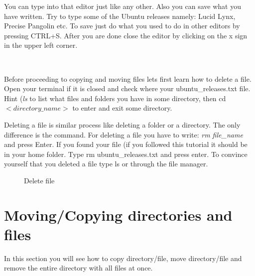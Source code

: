 \par \noindent You can type into that editor just like any other. Also you can save what you have written. Try to type some of the Ubuntu releases namely: Lucid Lynx, Precise Pangolin etc. To save just do what you used to do in other editors by pressing CTRL+S. After you are done close the editor by clicking on the x sign in the upper left corner.  \\

\par \noindent {} \\

\par \noindent Before proceeding to copying and moving files lets first learn how to delete a file. Open your terminal if it is closed and check where your ubuntu\_releases.txt file. Hint (\textit{ls} to list what files and folders  you have in some directory, then cd  $<directory\_name>$ to enter and exit some directory.  \\

\par \noindent Deleting a file is similar process like deleting a folder or a directory. The only difference is the command. For deleting a file you have to write: \textit{rm file\_name} and press Enter. If you found your file (if you followed this tutorial it should be in your home folder. Type rm ubuntu\_releases.txt and press enter. To convince yourself that you deleted a file type ls or through the file manager. 

\begin{figure}[h!]	
	\centering
	\caption{Delete file}	
	\label{fig:rm1}	
\end{figure}

\section{Moving/Copying directories and files} 
In this section you will see how to copy directory/file, move directory/file and remove the entire directory with all files at once. \\

